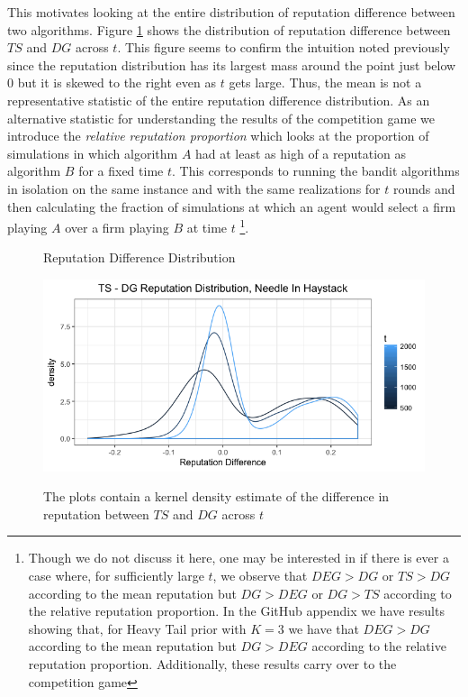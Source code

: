 \documentclass{article}
\theoremstyle{definition}
\begin{document}
This motivates looking at the entire distribution of reputation difference between two algorithms. Figure \ref{ts_dg_rep_diff_nih} shows the distribution of reputation difference between $TS$ and $DG$ across $t$. This figure seems to confirm the intuition noted previously since the reputation distribution has its largest mass around the point just below 0 but it is skewed to the right even as $t$ gets large. Thus, the mean is not a representative statistic of the entire reputation difference distribution. As an alternative statistic for understanding the results of the competition game we introduce the \textit{relative reputation proportion} which looks at the proportion of simulations in which algorithm $A$ had at least as high of a reputation as algorithm $B$ for a fixed time $t$. This corresponds to running the bandit algorithms in isolation on the same instance and with the same realizations for $t$ rounds and then calculating the fraction of simulations at which an agent would select a firm playing $A$ over a firm playing $B$ at time $t$ \footnote{Though we do not discuss it here, one may be interested in if there is ever a case where, for sufficiently large $t$, we observe that $DEG >DG$ or $TS > DG$ according to the mean reputation but $DG > DEG$ or $DG > TS$ according to the relative reputation proportion. In the GitHub appendix we have results showing that, for Heavy Tail prior with $K=3$ we have that $DEG > DG$ according to the mean reputation but $DG > DEG$ according to the relative reputation proportion. Additionally, these results carry over to the competition game}.

\begin{figure}
\caption{Reputation Difference Distribution}
\includegraphics[scale=0.35]{figures/ts_dg_rep_diff_nih}
\label{ts_dg_rep_diff_nih}
\caption*{\tiny{The plots contain a kernel density estimate of the difference in reputation between $TS$ and $DG$ across $t$}}
\end{figure}
\end{document}
